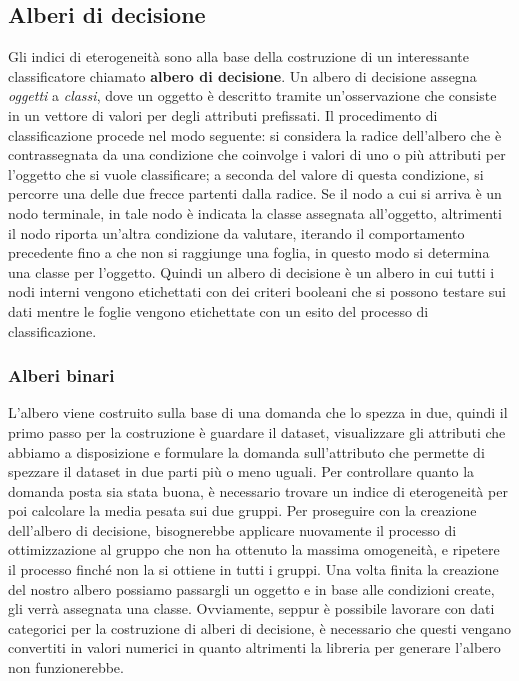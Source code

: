 \subsection{Alberi di decisione}
Gli indici di eterogeneità sono alla base della costruzione di un interessante classificatore chiamato \textbf{albero di decisione}. Un albero di decisione assegna \textit{oggetti} a \textit{classi}, dove un oggetto è descritto tramite un'osservazione che consiste in un vettore di valori per degli attributi prefissati. 
\newline \newline
Il procedimento di classificazione procede nel modo seguente: si considera la radice dell'albero che è contrassegnata da una condizione che coinvolge i valori di uno o più attributi per l'oggetto che si vuole classificare; a seconda del valore di questa condizione, si percorre una delle due frecce partenti dalla radice. Se il nodo a cui si arriva è un nodo terminale, in tale nodo è indicata la classe assegnata all'oggetto, altrimenti il nodo riporta un'altra condizione da valutare, iterando il comportamento precedente fino a che non si raggiunge una foglia, in questo modo si determina una classe per l'oggetto. 
\newline \newline
Quindi un albero di decisione è un albero in cui tutti i nodi interni vengono etichettati con dei criteri booleani che si possono testare sui dati mentre le foglie vengono etichettate con un esito del processo di classificazione.

\subsubsection{Alberi binari}
L'albero viene costruito sulla base di una domanda che lo spezza in due, quindi il primo passo per la costruzione è guardare il dataset, visualizzare gli attributi che abbiamo a disposizione e formulare la domanda sull'attributo che permette di spezzare il dataset in due parti più o meno uguali. Per controllare quanto la domanda posta sia stata buona, è necessario trovare un indice di eterogeneità per poi calcolare la media pesata sui due gruppi.
\newline
Per proseguire con la creazione dell'albero di decisione, bisognerebbe applicare nuovamente il processo di ottimizzazione al gruppo che non ha ottenuto la massima omogeneità, e ripetere il processo finché non la si ottiene in tutti i gruppi.
\newline
Una volta finita la creazione del nostro albero possiamo passargli un oggetto e in base alle condizioni create, gli verrà assegnata una classe. Ovviamente, seppur è possibile lavorare con dati categorici per la costruzione di alberi di decisione, è necessario che questi vengano convertiti in valori numerici in quanto altrimenti la libreria per generare l'albero non funzionerebbe.

